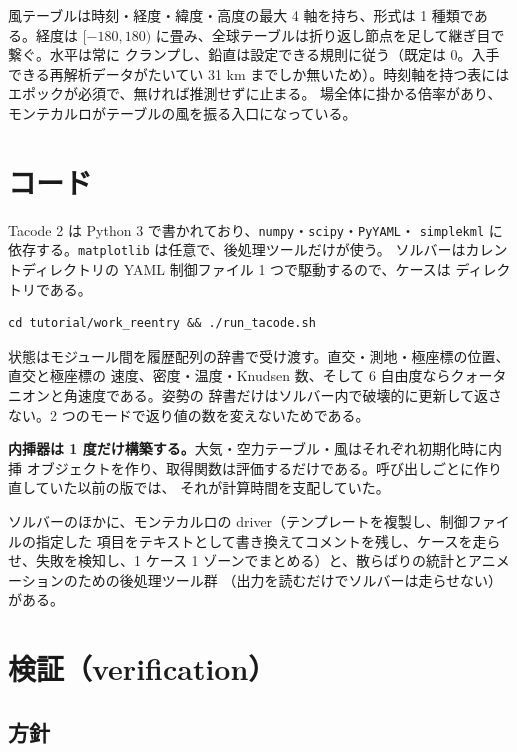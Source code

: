 \documentclass[11pt,a4paper,dvipdfmx]{jsarticle}
\begin{document}
風テーブルは時刻・経度・緯度・高度の最大 4 軸を持ち、形式は 1 種類である。経度は
$[-180, 180)$ に畳み、全球テーブルは折り返し節点を足して継ぎ目で繋ぐ。水平は常に
クランプし、鉛直は設定できる規則に従う（既定は 0。入手できる再解析データがたいてい
31 km までしか無いため）。時刻軸を持つ表にはエポックが必須で、無ければ推測せずに止まる。
場全体に掛かる倍率があり、モンテカルロがテーブルの風を振る入口になっている。

\section{コード}

Tacode 2 は Python 3 で書かれており、\texttt{numpy}・\texttt{scipy}・\texttt{PyYAML}・
\texttt{simplekml} に依存する。\texttt{matplotlib} は任意で、後処理ツールだけが使う。
ソルバーはカレントディレクトリの YAML 制御ファイル 1 つで駆動するので、ケースは
ディレクトリである。

\begin{lstlisting}
cd tutorial/work_reentry && ./run_tacode.sh
\end{lstlisting}

状態はモジュール間を履歴配列の辞書で受け渡す。直交・測地・極座標の位置、直交と極座標の
速度、密度・温度・Knudsen 数、そして 6 自由度ならクォータニオンと角速度である。姿勢の
辞書だけはソルバー内で破壊的に更新して返さない。2 つのモードで返り値の数を変えないためである。

\textbf{内挿器は 1 度だけ構築する。}大気・空力テーブル・風はそれぞれ初期化時に内挿
オブジェクトを作り、取得関数は評価するだけである。呼び出しごとに作り直していた以前の版では、
それが計算時間を支配していた。

ソルバーのほかに、モンテカルロの driver（テンプレートを複製し、制御ファイルの指定した
項目をテキストとして書き換えてコメントを残し、ケースを走らせ、失敗を検知し、1 ケース
1 ゾーンでまとめる）と、散らばりの統計とアニメーションのための後処理ツール群
（出力を読むだけでソルバーは走らせない）がある。

\section{検証（verification）} \label{verification}

\subsection{方針}
\end{document}
